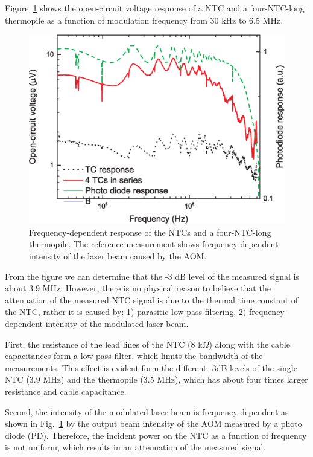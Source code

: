 \documentclass[journal]{IEEEtran}
\begin{document}
Figure~\ref{fig4} shows the open-circuit voltage response of a NTC and a four-NTC-long thermopile as a function of modulation frequency from 30 kHz to 6.5 MHz. 
%
\begin{figure}[h]
\centerline{\includegraphics[width=1.0\columnwidth,clip]{figures/Fig12n}}
\caption{Frequency-dependent response of the NTCs and a four-NTC-long thermopile. The reference measurement shows frequency-dependent intensity of the laser beam caused by the AOM.}
\label{fig4}
\end{figure}
%
From the figure we can determine that the -3 dB level of the measured signal is about 3.9 MHz. However, there is no physical reason to believe that the attenuation of the measured NTC signal is due to the thermal time constant of the NTC, rather it is caused by: 1) parasitic low-pass filtering, 2) frequency-dependent intensity of the modulated laser beam.

First, the resistance of the lead lines of the NTC (8 k$\Omega$) along with the cable capacitances form a low-pass filter, which limits the bandwidth of the measurements. This effect is evident form the different -3dB levels of the single NTC (3.9 MHz) and the thermopile (3.5 MHz), which has about four times larger resistance and cable capacitance.

Second, the intensity of the modulated laser beam is frequency dependent as shown in Fig.~\ref{fig4} by the output beam intensity of the AOM measured by a photo diode (PD). Therefore, the incident power on the NTC as a function of frequency is not uniform, which results in an attenuation of the measured signal.
\end{document}
